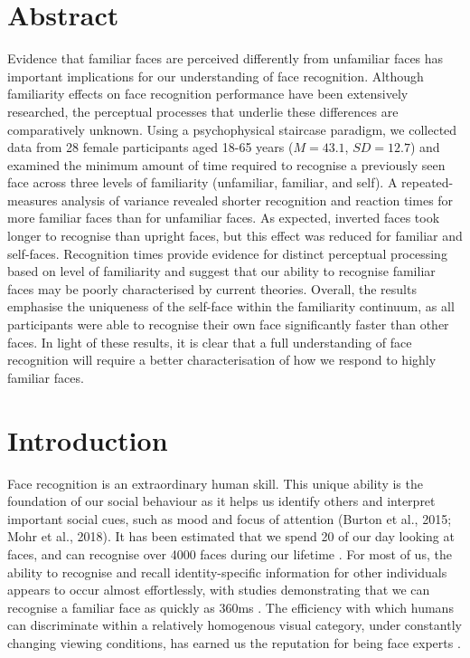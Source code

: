 \documentclass[
  10pt,
  letterpaper,
]{article}
\begin{document}
\section*{Abstract}
Evidence that familiar faces are perceived differently from unfamiliar
faces has important implications for our understanding of face
recognition. Although familiarity effects on face recognition
performance have been extensively researched, the perceptual processes
that underlie these differences are comparatively unknown. Using a
psychophysical staircase paradigm, we collected data from 28 female
participants aged 18-65 years (\(M = 43.1\), \(SD = 12.7\)) and examined
the minimum amount of time required to recognise a previously seen face
across three levels of familiarity (unfamiliar, familiar, and self). A
repeated-measures analysis of variance revealed shorter recognition and
reaction times for more familiar faces than for unfamiliar faces. As
expected, inverted faces took longer to recognise than upright faces,
but this effect was reduced for familiar and self-faces. Recognition
times provide evidence for distinct perceptual processing based on level
of familiarity and suggest that our ability to recognise familiar faces
may be poorly characterised by current theories. Overall, the results
emphasise the uniqueness of the self-face within the familiarity
continuum, as all participants were able to recognise their own face
significantly faster than other faces. In light of these results, it is
clear that a full understanding of face recognition will require a
better characterisation of how we respond to highly familiar faces.


\linenumbers
\section{Introduction}\label{introduction}

Face recognition is an extraordinary human skill. This unique ability is
the foundation of our social behaviour as it helps us identify others
and interpret important social cues, such as mood and focus of attention
(Burton et al., 2015; Mohr et al., 2018). It has been estimated that we
spend 20\(%
\) of our day looking at faces, and can recognise over 4000 faces during
our lifetime \citep{jenkins2018a, oruc2019a}. For most of us, the
ability to recognise and recall identity-specific information for other
individuals appears to occur almost effortlessly, with studies
demonstrating that we can recognise a familiar face as quickly as 360ms
\citep{besson2016a, blauch2021a, oruc2019a, ramon2016a}. The efficiency
with which humans can discriminate within a relatively homogenous visual
category, under constantly changing viewing conditions, has earned us
the reputation for being face experts
\citep{collins2018a, dobs2019a, kramer2017a, quek2021a}.
\end{document}
